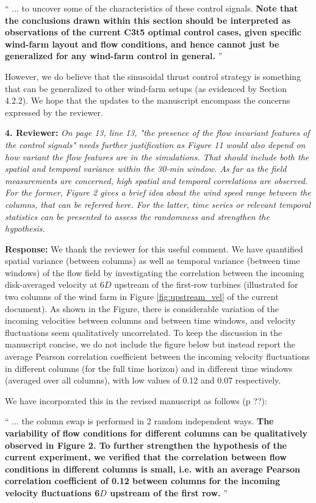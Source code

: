 \documentclass[]{article}
\begin{document}
`` 
... to uncover some of the characteristics of these control signals. \textbf{Note that the conclusions drawn within this section should be interpreted as observations of the current C3t5 optimal control cases, given specific wind-farm layout and flow conditions, and hence cannot just be generalized for any wind-farm control in general.}
''

However, we do believe that the sinusoidal thrust control strategy is something that can be generalized to other wind-farm setups (as evidenced by Section 4.2.2). We hope that the updates to the manuscript encompass the concerns expressed by the reviewer.

\dotfill

\textbf{4. Reviewer: } \textit{On page 13, line 13, "the presence of the flow invariant features of the control signals"
	needs further justification as Figure 11 would also depend on how variant the flow
	features are in the simulations. That should include both the spatial and temporal
	variance within the 30-min window. As far as the field measurements are concerned,
	high spatial and temporal correlations are observed. For the former, Figure 2 gives a
	brief idea about the wind speed range between the columns, that can be referred here.
	For the latter, time series or relevant temporal statistics can be presented to assess the
	randomness and strengthen the hypothesis.}

\textbf{Response: } We thank the reviewer for this useful comment. We have quantified spatial variance (between columns) as well as temporal variance (between time windows) of the flow field by investigating the correlation between the incoming disk-averaged velocity at 6$D$ upstream of the first-row turbines (illustrated for two columns of the wind farm in Figure \ref{fig:upstream_vel} of the current document). As shown in the Figure, there is considerable variation of the incoming velocities between columns and between time windows, and velocity fluctuations seem qualitatively uncorrelated. To keep the discussion in the manuscript concise, we do not include the figure below but instead report the average Pearson correlation coefficient between the incoming velocity fluctuations in different columns (for the full time horizon) and in different time windows (averaged over all columns), with low values of 0.12 and 0.07 respectively. 

We have incorporated this in the revised manuscript as follows (p ??): 

``
... the column swap is performed in 2 random independent ways. \textbf{The variability of flow conditions for different columns can be qualitatively observed in Figure 2. To further strengthen the hypothesis of the current experiment, we verified that the  correlation between flow conditions in different columns is small, i.e. with an average Pearson correlation coefficient of 0.12 between columns for the incoming velocity fluctuations 6$D$ upstream of the first row.}
''
\end{document}
